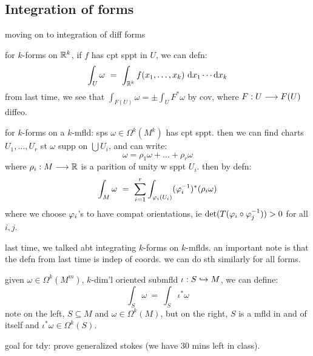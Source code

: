 \subsection{Integration of forms}
moving on to integration of diff forms

for $k$-forms on $\mathbb{R}^{k}$, if $f$ has cpt sppt in $U$, we can defn:
\begin{equation*}
	\int_{U}\omega \ = \ \int_{\bR^{k}}f(x_{1},\dots,x_{k})\di x_{1}\cdots\d x_{k}
\end{equation*}
from last time, we see that $\int_{F(U)}\omega=\pm\int_{U}F^{*}\omega$ by cov, where
$F:U\longrightarrow F(U)$ diffeo.

for $k$-forms on a $k$-mfld:
sps $\omega\in\Omega^{k}(M^{k})$ has cpt sppt.
then we can find charts $U_{1},\dots,U_{r}$ st $\omega$ supp on $\bigcup U_{i}$, and
can write:
\begin{equation*}
	\omega=\rho_{1}\omega+\dots +\rho_{r}\omega
\end{equation*}
where $\rho_{i}:M\longrightarrow\mathbb{R}$ is a parition of unity w sppt $U_{i}$. then by defn:
\begin{equation*}
	\int_{M}\omega \ = \ \sum_{i=1}^{r}\int_{\vphi_{i}(U_{i})}(\vphi_{i}^{-1})^{*}(\rho_{i}\omega)
\end{equation*}
where we choose $\varphi_{i}$'s to have compat orientations, ie
$\det(T(\varphi_{i}\circ\varphi_{j}^{-1}))>0$ for all $i,j$.

last time, we talked abt integrating $k$-forms on $k$-mflds.
an important note is that the defn from last time is indep of coords.
we can do sth similarly for all forms.

\begin{defn}
	given $\omega\in\Omega^{k}(M^{m})$, $k$-dim'l oriented submfld $\iota:S\hookrightarrow M$,
	we can define:
	\begin{equation*}
		\int_{S}\omega \ = \ \int_{S}\iota^{*}\omega
	\end{equation*}
	note on the left, $S\subseteq M$ and $\omega\in\Omega^{k}(M)$, but
	on the right, $S$ is a mfld in and of itself and $\iota^{*}\omega\in\Omega^{k}(S)$.
\end{defn}
goal for tdy: prove generalized stokes (we have 30 mins left in class).
